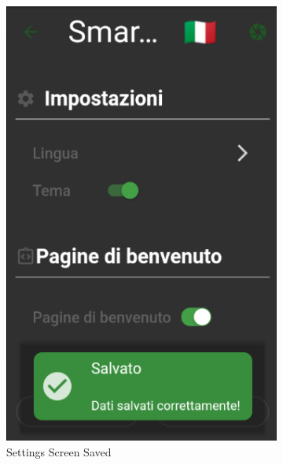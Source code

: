 \documentclass[a4paper,12pt]{report}
\begin{document}
\begin{figure}[H]
\begin{subfigure}{0.3\textwidth}
			\includegraphics[width=\textwidth]{./images/settings/settings_screen_saved.png}
			\caption{Settings Screen Saved}
			\label{fig:settings_saved}
		\end{subfigure}
	\hfill
	\begin{subfigure}{0.3\textwidth}

\end{subfigure}
\end{figure}
\end{document}
